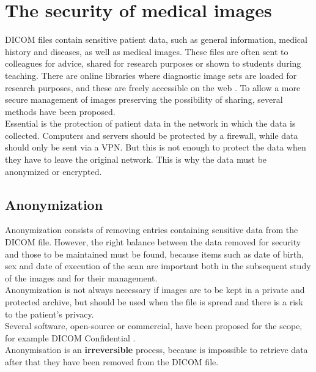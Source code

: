 \section{The security of medical images}
DICOM files contain sensitive patient data, such as general information, medical history and diseases, as well as medical images. These files are often sent to colleagues for advice, shared for research purposes or shown to students during teaching. There are online libraries where diagnostic image sets are loaded for research purposes, and these are freely accessible on the web \parencite{Reference24}. To allow a more secure management of images preserving the possibility of sharing, several methods have been proposed. \\
Essential is the protection of patient data in the network in which the data is collected. Computers and servers should be protected by a firewall, while data should only be sent via a VPN. But this is not enough to protect the data when they have to leave the original network. This is why the data must be anonymized or encrypted.

\subsection{Anonymization}
Anonymization consists of removing entries containing sensitive data from the DICOM file. However, the right balance between the data removed for security and those to be maintained must be found, because items such as date of birth, sex and date of execution of the scan are important both in the subsequent study of the images and for their management.\\
Anonymization is not always necessary if images are to be kept in a private and protected archive, but should be used when the file is spread and there is a risk to the patient's privacy. \\
Several software, open-source or commercial, have been proposed for the scope, for example DICOM Confidential \parencite{Reference46}. \\Anonymisation is an \textbf{irreversible} process, because is impossible to retrieve data after that they have been removed from the DICOM file.

